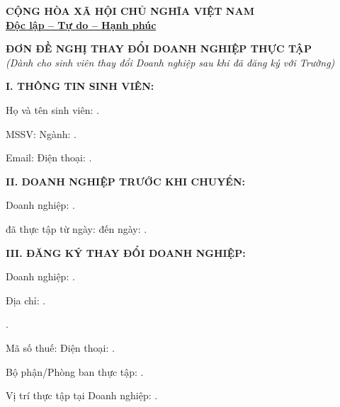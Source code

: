 \documentclass[12pt]{article}
\newcommand{\densedotfill}{\leavevmode\cleaders\hbox{.\hspace{1.5pt}}\hfill\kern0pt}
\begin{document}
\begin{flushright}
\end{flushright}

\vspace{-1.5cm}
\begin{center}
\textbf{CỘNG HÒA XÃ HỘI CHỦ NGHĨA VIỆT NAM}\\
\textbf{\underline{Độc lập – Tự do – Hạnh phúc}}\\
\vspace{0.2cm}
\end{center}

\vspace{1cm}

\begin{center}
\textbf{\Large ĐƠN ĐỀ NGHỊ THAY ĐỔI DOANH NGHIỆP THỰC TẬP}\\
\textit{(Dành cho sinh viên thay đổi Doanh nghiệp sau khi đã đăng ký với Trường)}
\end{center}

\vspace{0.5cm}

\noindent \textbf{I. THÔNG TIN SINH VIÊN:}

\noindent Họ và tên sinh viên: \densedotfill

\noindent MSSV: \makebox[4cm]{\densedotfill} Ngành: \densedotfill

\noindent Email: \makebox[4cm]{\densedotfill} Điện thoại: \densedotfill

\vspace{0.5cm}

\noindent \textbf{II. DOANH NGHIỆP TRƯỚC KHI CHUYỂN:}

\noindent Doanh nghiệp: \densedotfill

\noindent đã thực tập từ ngày: \makebox[3cm]{\densedotfill} đến ngày: \densedotfill

\vspace{0.5cm}

\noindent \textbf{III. ĐĂNG KÝ THAY ĐỔI DOANH NGHIỆP:}

\noindent Doanh nghiệp: \densedotfill

\noindent Địa chỉ: \densedotfill

\noindent \densedotfill

\noindent Mã số thuế: \makebox[4cm]{\densedotfill} Điện thoại: \densedotfill

\noindent Bộ phận/Phòng ban thực tập: \densedotfill

\noindent Vị trí thực tập tại Doanh nghiệp: \densedotfill
\end{document}
